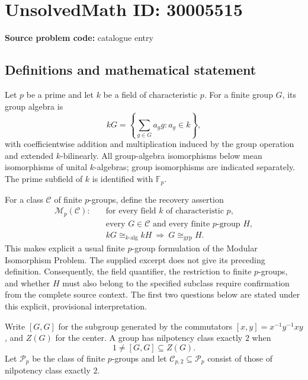 \documentclass[11pt]{article}
\newcommand{\F}{\mathbb{F}}
\begin{document}
\section*{UnsolvedMath ID: 30005515}
\textbf{Source problem code:} catalogue entry
\subsection{Definitions and mathematical statement}
Let \(p\) be a prime and let \(k\) be a field of characteristic \(p\). For a finite group \(G\), its group algebra is
\[
 kG=\left\{\sum_{g\in G}a_g g:a_g\in k\right\},
\]
with coefficientwise addition and multiplication induced by the group operation and extended \(k\)-bilinearly. All group-algebra isomorphisms below mean isomorphisms of unital \(k\)-algebras; group isomorphisms are indicated separately. The prime subfield of \(k\) is identified with \(\F_p\).

For a class \(\mathcal C\) of finite \(p\)-groups, define the recovery assertion
\[
\begin{split}
\mathcal M_p(\mathcal C):\quad
&\text{for every field }k\text{ of characteristic }p,\\
&\text{every }G\in\mathcal C\text{ and every finite }p\text{-group }H,\\
&kG\cong_{k\text{-alg}}kH\ \Longrightarrow\ G\cong_{\mathrm{grp}}H.
\end{split}
\]
This makes explicit a usual finite \(p\)-group formulation of the Modular Isomorphism Problem. The supplied excerpt does not give its preceding definition. Consequently, the field quantifier, the restriction to finite \(p\)-groups, and whether \(H\) must also belong to the specified subclass require confirmation from the complete source context. The first two questions below are stated under this explicit, provisional interpretation.

Write \([G,G]\) for the subgroup generated by the commutators \([x,y]=x^{-1}y^{-1}xy\), and \(Z(G)\) for the center. A group has nilpotency class exactly \(2\) when
\[
1\ne [G,G]\subseteq Z(G).
\]
Let \(\mathcal P_p\) be the class of finite \(p\)-groups and let \(\mathcal C_{p,2}\subseteq\mathcal P_p\) consist of those of nilpotency class exactly \(2\).
\end{document}

